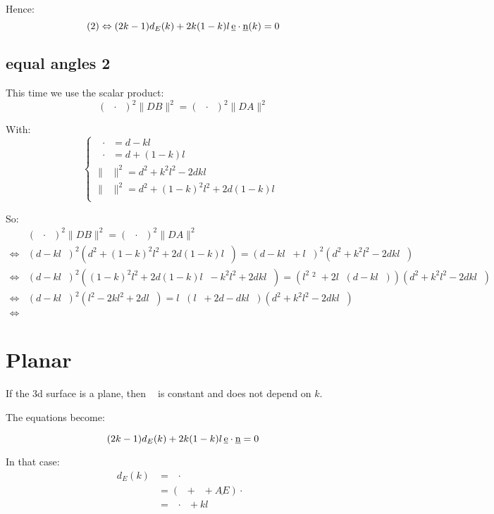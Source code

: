 \documentclass[10pt,a4paper]{article}
\newcommand{\ud}[1]{\underline{#1}}
\DeclareMathOperator{\DA}{\ud{DA}}
\DeclareMathOperator{\DB}{\ud{DB}}
\DeclareMathOperator{\DE}{\ud{DE}}
\DeclareMathOperator{\DC}{\ud{DC}}
\DeclareMathOperator{\CA}{\ud{CA}}
\DeclareMathOperator{\n}{\ud{n}}
\DeclareMathOperator{\en}{\ud{e}\cdot\ud{n}}
\begin{document}
Hence:
$$
(2) \Leftrightarrow (2k - 1)d_E(k) + 2k(1-k)l\en(k) = 0\\
$$

\newpage
\subsection{equal angles 2}

This time we use the scalar product:
$$
    (\DA\cdot\n)^2 \|DB\|^2 = (\DB\cdot\n)^2 \|DA\|^2
$$

With:
$$
\left\{
\begin{array}{ll}
    \DA\cdot\n = d - kl\en\\
    \DB\cdot\n = d + (1-k)l\en\\
    \|\DA\|^2 = d^2 + k^2l^2 - 2dkl\en\\
    \|\DB\|^2 = d^2 + (1-k)^2l^2 + 2d(1-k)l\en\\
\end{array}
\right.
$$

So:
$$
\begin{array}{ll}
    & (\DA\cdot\n)^2 \|DB\|^2 = (\DB\cdot\n)^2 \|DA\|^2\\
    \Leftrightarrow &
    (d - kl\en)^2 (d^2 + (1-k)^2l^2 + 2d(1-k)l\en)
    = (d - kl\en + l\en)^2 (d^2 + k^2l^2 - 2dkl\en)\\
    \Leftrightarrow &
    (d - kl\en)^2 ((1-k)^2l^2 + 2d(1-k)l\en - k^2l^2 + 2dkl\en)
    = (l^2\en^2 + 2l\en(d - kl\en))(d^2 + k^2l^2 - 2dkl\en)\\
    \Leftrightarrow &
    (d - kl\en)^2 (l^2 - 2kl^2 + 2dl\en)
    = l\en(l\en + 2d - dkl\en)(d^2 + k^2l^2 - 2dkl\en)\\
    \Leftrightarrow &

\end{array}
$$


\newpage
\section{Planar}

If the 3d surface is a plane, then $\n$ is constant and does not depend on $k$.

The equations become:

\begin{equation}
    (2k - 1)d_E(k) + 2k(1-k)l\en = 0\\
\end{equation}

In that case:
$$
\begin{array}{ll}
    d_E(k)
    & = \DE \cdot \n\\
    & = \left( \DC + \CA + \ud{AE} \right) \cdot \n\\
    & = \CA \cdot \n + kl \en\\
\end{array}
$$
\end{document}
